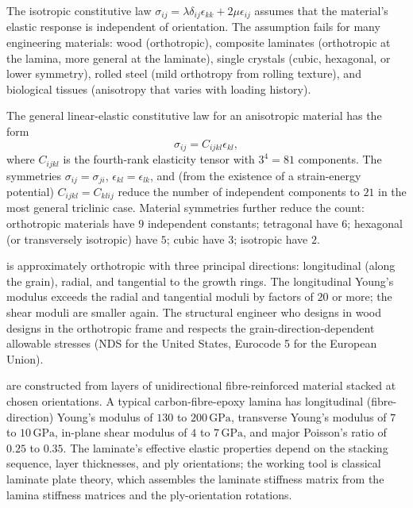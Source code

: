 The isotropic constitutive law $\sigma_{ij} = \lambda \delta_{ij}
\epsilon_{kk} + 2\mu \epsilon_{ij}$ assumes that the material's
elastic response is independent of orientation. The assumption
fails for many engineering materials: wood (orthotropic), composite
laminates (orthotropic at the lamina, more general at the
laminate), single crystals (cubic, hexagonal, or lower symmetry),
rolled steel (mild orthotropy from rolling texture), and biological
tissues (anisotropy that varies with loading history).

The general linear-elastic constitutive law for an anisotropic
material has the form
\[
\sigma_{ij} = C_{ijkl} \epsilon_{kl},
\]
where $C_{ijkl}$ is the fourth-rank elasticity tensor with
$3^4 = 81$ components. The symmetries $\sigma_{ij} = \sigma_{ji}$,
$\epsilon_{kl} = \epsilon_{lk}$, and (from the existence of a
strain-energy potential) $C_{ijkl} = C_{klij}$ reduce the number
of independent components to $21$ in the most general triclinic
case. Material symmetries further reduce the count: orthotropic
materials have $9$ independent constants; tetragonal have $6$;
hexagonal (or transversely isotropic) have $5$; cubic have $3$;
isotropic have $2$.

 is approximately orthotropic with three principal
directions: longitudinal (along the grain), radial, and tangential
to the growth rings. The longitudinal Young's modulus exceeds the
radial and tangential moduli by factors of $20$ or more; the shear
moduli are smaller again. The structural engineer who designs in
wood designs in the orthotropic frame and respects the
grain-direction-dependent allowable stresses (NDS for the United
States, Eurocode 5 for the European Union).

 are constructed from layers of
unidirectional fibre-reinforced material stacked at chosen
orientations. A typical carbon-fibre-epoxy lamina has
longitudinal (fibre-direction) Young's modulus of $130$ to $200\,
\text{GPa}$, transverse Young's modulus of $7$ to $10\,\text{GPa}$,
in-plane shear modulus of $4$ to $7\,\text{GPa}$, and major
Poisson's ratio of $0.25$ to $0.35$. The laminate's effective
elastic properties depend on the stacking sequence, layer
thicknesses, and ply orientations; the working tool is classical
laminate plate theory, which assembles the laminate stiffness
matrix from the lamina stiffness matrices and the ply-orientation
rotations.

